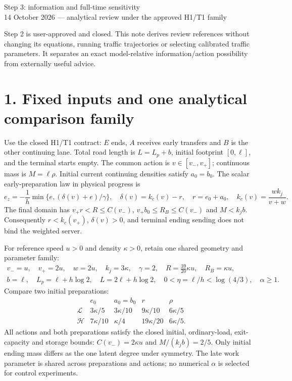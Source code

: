 \documentclass[11pt,a4paper]{article}
\begin{document}
\begin{center}
{\Large Step 3: information and full-time sensitivity}\\[4pt]
14 October 2026 --- analytical review under the approved H1/T1 family
\end{center}

Step 2 is user-approved and closed. This note derives review references
without changing its equations, running traffic trajectories or selecting
calibrated traffic parameters. It separates an exact model-relative
information/action possibility from externally useful advice.

\section*{1. Fixed inputs and one analytical comparison family}
Use the closed H1/T1 contract: $E$ ends, $A$ receives early transfers and
$B$ is the other continuing lane. Total road length is $L=L_p+b$, initial
footprint $[0,\ell]$, and the terminal starts empty. The common action is
$v\in[v_-,v_+]$; continuous mass is $M=\ell\rho$.
Initial current continuing densities satisfy $a_0=b_0$.
The scalar early-preparation law in physical progress is
\[
 e_z=-\frac1h\min\{e,(\delta(v)+e)/\gamma\},\quad
 \delta(v)=k_c(v)-r,\quad r=e_0+a_0,\quad
 k_c(v)=\frac{wk_j}{v+w}.
 \tag{1}
\]
The final domain has $v_+r<R\leq C(v_-)$, $v_+b_0\leq R_B\leq C(v_-)$
and $M<k_jb$. Consequently $r<k_c(v_+)$, $\delta(v)>0$, and terminal
ending sending does not bind the weighted server.

For reference speed $u>0$ and density $\kappa>0$, retain one shared geometry
and parameter family:
\[
 \begin{gathered}
 v_-=u,\quad v_+=2u,\quad w=2u,\quad k_j=3\kappa,\quad
 \gamma=2,\quad R=\frac{39}{20}\kappa u,\quad R_B=\kappa u,\\
 b=\ell,\quad L_p=\ell+h\log2,\quad L=2\ell+h\log2,\quad
 0<\eta=\ell/h<\log(4/3),\quad \alpha\geq1 .
 \end{gathered}
 \tag{2}
\]
Compare two initial preparations:
\[
 \begin{array}{c|cccc}
 &e_0&a_0=b_0&r&\rho\\ \hline
 \mathcal L&3\kappa/5&3\kappa/10&9\kappa/10&6\kappa/5\\
 \mathcal H&7\kappa/10&\kappa/4&19\kappa/20&6\kappa/5 .
 \end{array}
 \tag{3}
\]
All actions and both preparations satisfy the closed initial, ordinary-load,
exit-capacity and storage bounds: $C(v_-)=2\kappa u$ and
$M/(k_jb)=2/5$. Only initial ending mass differs as the one latent degree
under symmetry. The late work parameter is shared across preparations and
actions; no numerical $\alpha$ is selected for control experiments.
\end{document}
